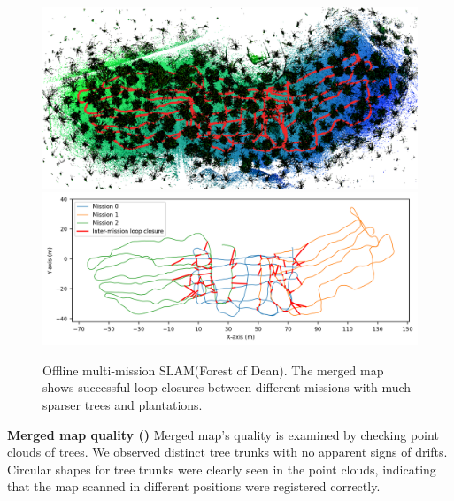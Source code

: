\begin{figure}[htbp]
  \centering
  \includegraphics[width=\columnwidth]{pics/exp_3_offline_Dean_pcd3.png}
  \includegraphics[width=\columnwidth]{pics/exp_3_1_multimission_slam_dean_ratio.png}
  \caption{Offline multi-mission SLAM(Forest of Dean). The merged map shows successful loop closures between different missions with much sparser trees and plantations.}
  \label{fig:exp_multi_mission_dean}
\end{figure}
\newline
\textbf{Merged map quality ()}\hspace{0.5em} Merged map's quality is examined by checking point clouds of trees. We observed distinct tree trunks with no apparent signs of drifts. Circular shapes for tree trunks were clearly seen in the point clouds, indicating that the map scanned in different positions were registered correctly. 
